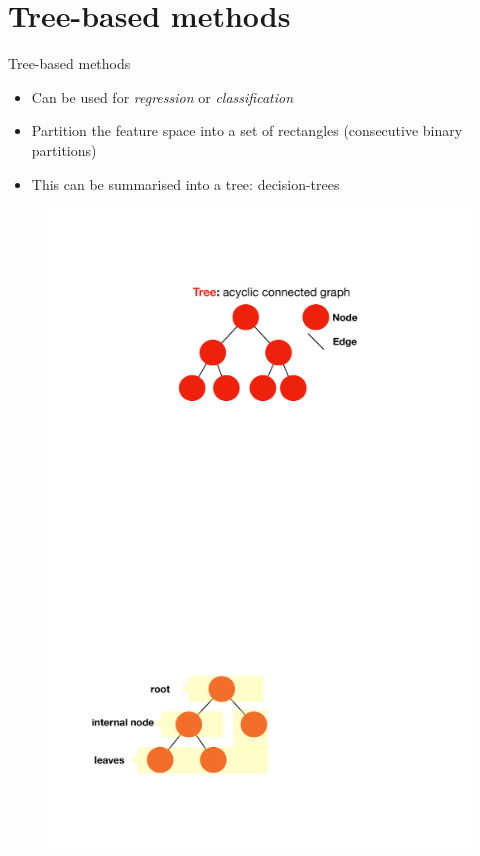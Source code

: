 \documentclass[notes]{beamer}          %
\begin{document}
\section{Tree-based methods}
\begin{frame}{Tree-based methods}
\begin{itemize}
 \item Can be used for \textit{regression} or \textit{classification}
 \item Partition the feature space into a set of rectangles (consecutive binary partitions)
 \item This can be summarised into a tree: decision-trees
 \end{itemize}
 
 \begin{figure}
  \includegraphics[width=\linewidth]{../figures/week_2_classification/tree-example-a.pdf}  
\endminipage\hfill
{}
  \includegraphics[width=\linewidth]{../figures/week_2_classification/tree-example-b.pdf}  

\end{figure}
\end{frame}
\end{document}

